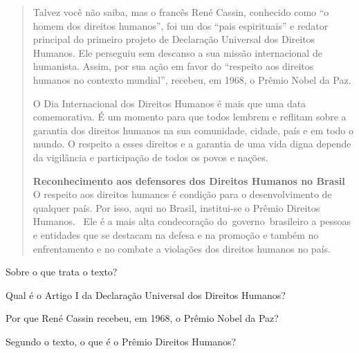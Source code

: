 \begin{escolha}
\begin{escolha}
{\begin{escolha}
\begin{quote}
Talvez você não saiba, mas o francês René Cassin, conhecido como ``o
homem dos direitos humanos'', foi um dos ``pais espirituais'' e redator
principal do primeiro projeto de Declaração Universal dos Direitos
Humanos. Ele perseguiu sem descanso a sua missão internacional de
humanista. Assim, por sua ação em favor do ``respeito aos direitos
humanos no contexto mundial'', recebeu, em 1968, o Prêmio Nobel da Paz.

O Dia Internacional dos Direitos Humanos é mais que uma data
comemorativa. É um momento para que todos lembrem e reflitam sobre a
garantia dos direitos humanos na sua comunidade, cidade, país e em todo
o mundo. O respeito a esses direitos e a garantia de uma vida digna
depende da vigilância e participação de todos os povos e nações.

\textbf{Reconhecimento aos defensores dos Direitos Humanos no Brasil}\\
O respeito aos direitos humanos é condição para o desenvolvimento de
qualquer país. Por isso, aqui no Brasil, institui-se o Prêmio Direitos
Humanos. ~Ele é a mais alta condecoração do~governo~brasileiro a pessoas
e entidades que se destacam na defesa e na promoção e também no
enfrentamento e no combate a violações dos direitos humanos no país.

\end{quote}

\begin{escolha}
\item Sobre o que trata o texto?


\item Qual é o Artigo I da Declaração Universal dos Direitos Humanos?


\item Por que René Cassin recebeu, em 1968, o Prêmio Nobel da Paz?


\item Segundo o texto, o que é o Prêmio Direitos Humanos?


\end{escolha}
\end{escolha}}
\end{escolha}
\end{escolha}
